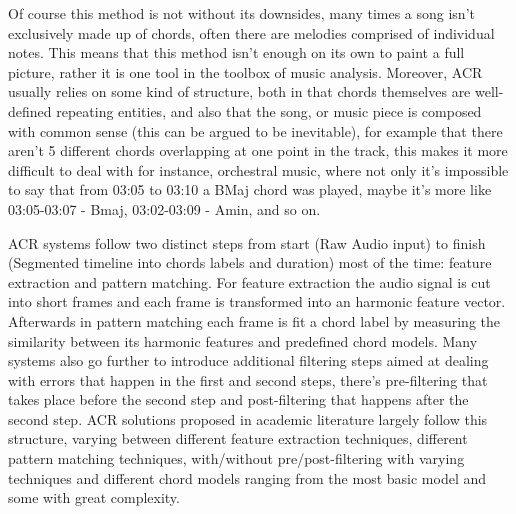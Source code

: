\documentclass[a4paper]{article}
\begin{document}
Of course this method is not without its downsides, many times a song isn't exclusively made up of chords, often there are melodies comprised of individual notes. This means that this method isn't enough on its own to paint a full picture, rather it is one tool in the toolbox of music analysis. Moreover, ACR usually relies on some kind of structure, both in that chords themselves are well-defined repeating entities, and also that the song, or music piece is composed with common sense (this can be argued to be inevitable), for example that there aren't 5 different chords overlapping at one point in the track, this makes it more difficult to deal with for instance, orchestral music, where not only it's impossible to say that from 03:05 to 03:10 a BMaj chord was played, maybe it's more like 03:05-03:07 - Bmaj, 03:02-03:09 - Amin, and so on.

ACR systems follow two distinct steps from start (Raw Audio input) to finish (Segmented timeline into chords labels and duration) most of the time: feature extraction and pattern matching. 
For feature extraction the audio signal is cut into short frames and each frame is transformed into an harmonic feature vector.
Afterwards in pattern matching each frame is fit a chord label by measuring the similarity between its harmonic features and predefined chord models.
Many systems also go further to introduce additional filtering steps aimed at dealing with errors that happen in the first and second steps, there's pre-filtering that takes place before the second step and post-filtering that happens after the second step.
ACR solutions proposed in academic literature largely follow this structure, varying between different feature extraction techniques, different pattern matching techniques, with/without pre/post-filtering with varying techniques and different chord models ranging from the most basic model and some with great complexity.
\end{document}
